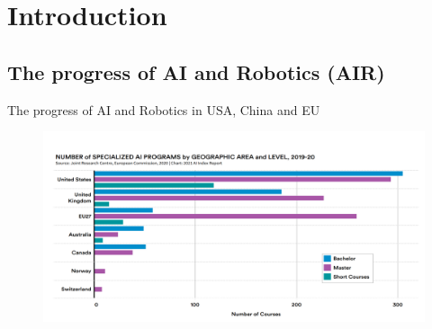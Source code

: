 \section{Introduction}

\subsection{The progress of AI and Robotics (AIR)}

{

\begin{frame}{The progress of AI and Robotics in USA, China and EU}

\begin{figure}
 \centering
 \includegraphics[width=1.0\textwidth]{./figures/progress-of-air/versions/drawing-v00.png}
\end{figure}

\end{frame}
}


